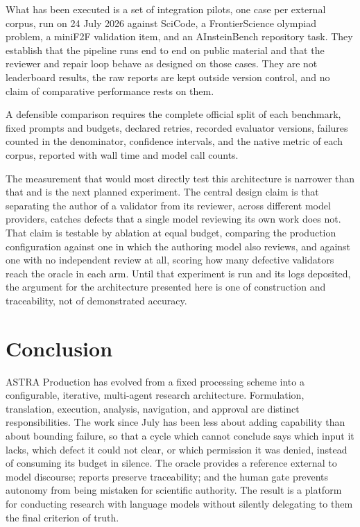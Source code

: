 \documentclass[11pt,a4paper]{article}
\begin{document}
What has been executed is a set of integration pilots, one case per external corpus, run on 24 July 2026 against SciCode, a FrontierScience olympiad problem, a miniF2F validation item, and an AInsteinBench repository task. They establish that the pipeline runs end to end on public material and that the reviewer and repair loop behave as designed on those cases. They are not leaderboard results, the raw reports are kept outside version control, and no claim of comparative performance rests on them.

A defensible comparison requires the complete official split of each benchmark, fixed prompts and budgets, declared retries, recorded evaluator versions, failures counted in the denominator, confidence intervals, and the native metric of each corpus, reported with wall time and model call counts.

The measurement that would most directly test this architecture is narrower than that and is the next planned experiment. The central design claim is that separating the author of a validator from its reviewer, across different model providers, catches defects that a single model reviewing its own work does not. That claim is testable by ablation at equal budget, comparing the production configuration against one in which the authoring model also reviews, and against one with no independent review at all, scoring how many defective validators reach the oracle in each arm. Until that experiment is run and its logs deposited, the argument for the architecture presented here is one of construction and traceability, not of demonstrated accuracy.

\section{Conclusion}

ASTRA Production has evolved from a fixed processing scheme into a configurable, iterative, multi-agent research architecture. Formulation, translation, execution, analysis, navigation, and approval are distinct responsibilities. The work since July has been less about adding capability than about bounding failure, so that a cycle which cannot conclude says which input it lacks, which defect it could not clear, or which permission it was denied, instead of consuming its budget in silence. The oracle provides a reference external to model discourse; reports preserve traceability; and the human gate prevents autonomy from being mistaken for scientific authority. The result is a platform for conducting research with language models without silently delegating to them the final criterion of truth.
\end{document}
